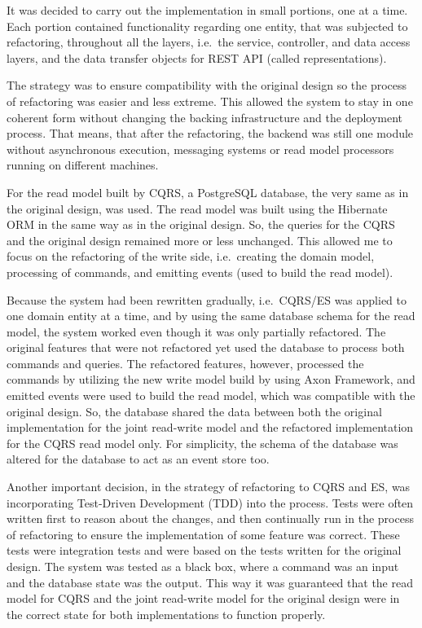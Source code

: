 \documentclass{book}
\begin{document}
It was decided to carry out the implementation in small portions, one at
a time. Each portion contained functionality regarding one entity, that
was subjected to refactoring, throughout all the layers, i.e.~the
service, controller, and data access layers, and the data transfer
objects for REST API (called representations).

The strategy was to ensure compatibility with the original design so the
process of refactoring was easier and less extreme. This allowed the
system to stay in one coherent form without changing the backing
infrastructure and the deployment process. That means, that after the
refactoring, the backend was still one module without asynchronous
execution, messaging systems or read model processors running on
different machines.

For the read model built by CQRS, a PostgreSQL database, the very same
as in the original design, was used. The read model was built using the
Hibernate ORM in the same way as in the original design. So, the queries
for the CQRS and the original design remained more or less unchanged.
This allowed me to focus on the refactoring of the write side,
i.e.~creating the domain model, processing of commands, and emitting
events (used to build the read model).

Because the system had been rewritten gradually, i.e.~CQRS/ES was
applied to one domain entity at a time, and by using the same database
schema for the read model, the system worked even though it was only
partially refactored. The original features that were not refactored yet
used the database to process both commands and queries. The refactored
features, however, processed the commands by utilizing the new write
model build by using Axon Framework, and emitted events were used to
build the read model, which was compatible with the original design. So,
the database shared the data between both the original implementation
for the joint read-write model and the refactored implementation for the
CQRS read model only. For simplicity, the schema of the database was
altered for the database to act as an event store too.

Another important decision, in the strategy of refactoring to CQRS and
ES, was incorporating Test-Driven Development (TDD) \cite{tdd} into the
process. Tests were often written first to reason about the changes, and
then continually run in the process of refactoring to ensure the
implementation of some feature was correct. These tests were integration
tests and were based on the tests written for the original design. The
system was tested as a black box, where a command was an input and the
database state was the output. This way it was guaranteed that the read
model for CQRS and the joint read-write model for the original design
were in the correct state for both implementations to function properly.
\end{document}
